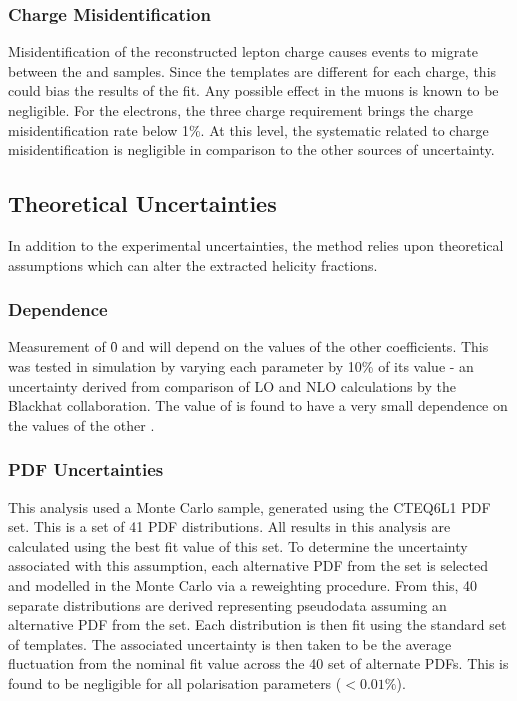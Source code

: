 \subsubsection{Charge Misidentification}
\label{sec:wpol_syst_charge_misid}
Misidentification of the reconstructed lepton charge causes events to migrate
between the \PWp and \PWm samples. Since the templates are different for each
charge, this could bias the results of the fit. Any possible effect in the muons
is known to be negligible. For the electrons, the three charge requirement
brings the charge misidentification rate below 1\%. At this level, the
systematic related to charge misidentification is negligible in comparison to
the other sources of uncertainty.


\subsection{Theoretical Uncertainties}
In addition to the experimental uncertainties, the method relies upon
theoretical assumptions which can alter the extracted helicity fractions.

\subsubsection{\Ai Dependence}
Measurement of \f0 and \fLmfR will depend on the values of the other \Ai
coefficients. This was tested in simulation by varying each parameter \Ai by
10\% of its value - an uncertainty derived from comparison of \ac{LO} and
\ac{NLO} calculations by the Blackhat collaboration. The value of \fLmfR is
found to have a very small dependence on the values of the other \Ai.

\subsubsection{\ac{PDF} Uncertainties}
This analysis used a \Wjets Monte Carlo sample, generated using the \ac{CTEQ6L1}
\ac{PDF} set. This is a set of 41 \ac{PDF} distributions. All results in this
analysis are calculated using the best fit value of this set. To determine the
uncertainty associated with this assumption, each alternative \ac{PDF} from the
set is selected and modelled in the Monte Carlo via a reweighting
procedure. From this, 40 separate \LP distributions are derived representing
pseudodata assuming an alternative \ac{PDF} from the set. Each distribution is
then fit using the standard set of templates. The associated uncertainty is then
taken to be the average fluctuation from the nominal fit value across the 40 set
of alternate \acp{PDF}. This is found to be negligible for all polarisation
parameters ($< 0.01\%$).

